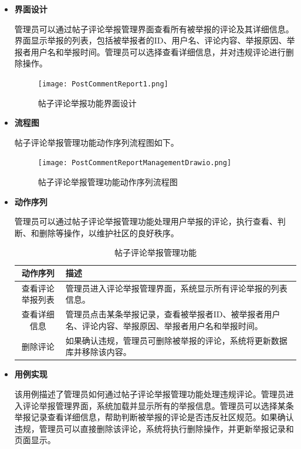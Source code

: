 \begin{itemize}
	\item \textbf{界面设计}
	
	管理员可以通过帖子评论举报管理界面查看所有被举报的评论及其详细信息。界面显示举报的列表，包括被举报者的ID、用户名、评论内容、举报原因、举报者用户名和举报时间。管理员可以选择查看详细信息，并对违规评论进行删除操作。

	\begin{figure}[H]
		\centering
		\texttt{[image: PostCommentReport1.png]}
		\caption{帖子评论举报功能界面设计}
		\label{fig:post-report.png}
	\end{figure}

	\item \textbf{流程图}
	
	帖子评论举报管理功能动作序列流程图如下。
	
	\begin{figure}[H]
		\centering
		\texttt{[image: PostCommentReportManagementDrawio.png]}
		\caption{帖子评论举报管理功能动作序列流程图}
		\label{fig:post-comment-report-management.drawio}
	\end{figure}
	
	\item \textbf{动作序列}
	
	管理员可以通过帖子评论举报管理功能处理用户举报的评论，执行查看、判断、和删除等操作，以维护社区的良好秩序。
	
	\begin{table}[H]
		\centering
		\caption{帖子评论举报管理功能}
		\renewcommand\arraystretch{1.5}
		\begin{tabular}{|c|>{\raggedright\arraybackslash}p{8cm}|}
			\hline
			\textbf{动作序列} & \textbf{描述} \\ \hline
			查看评论举报列表 & 管理员进入评论举报管理界面，系统显示所有评论举报的列表信息。 \\ \hline
			查看详细信息 & 管理员点击某条举报记录，查看被举报者ID、被举报者用户名、评论内容、举报原因、举报者用户名和举报时间。 \\ \hline
			删除评论 & 如果确认违规，管理员可删除被举报的评论，系统将更新数据库并移除该内容。 \\ \hline
		\end{tabular}
	\end{table}
	
	\item \textbf{用例实现}
	
	该用例描述了管理员如何通过帖子评论举报管理功能处理违规评论。管理员进入评论举报管理界面，系统加载并显示所有的举报信息。管理员可以选择某条举报记录查看详细信息，帮助判断被举报的评论是否违反社区规范。如果确认违规，管理员可以直接删除该评论，系统将执行删除操作，并更新举报记录和页面显示。


\end{itemize}
